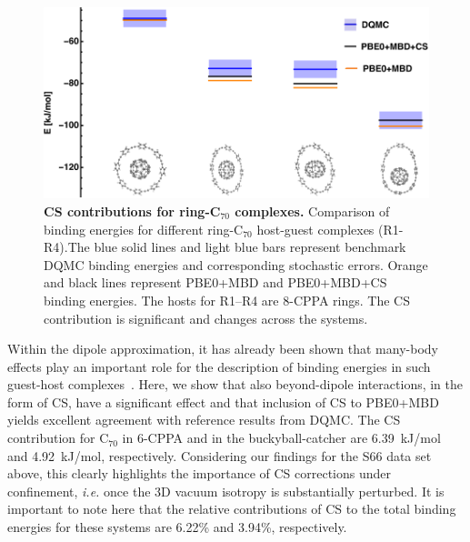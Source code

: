 \documentclass[aps,prl,groupaddress, twocolumn]{revtex4-1}  %
\begin{document}
\begin{figure}[hbtp]
\includegraphics[scale=1.]{Plots/Rings_new.pdf}
\caption{\textbf{CS contributions for ring-C$_{70}$ complexes.} Comparison of binding energies for different ring-C$_{70}$ host-guest complexes (R1-R4).The blue solid lines and light blue bars represent benchmark DQMC binding energies and corresponding stochastic errors. Orange and black lines represent PBE0+MBD and PBE0+MBD+CS binding energies. The hosts for R1--R4 are 8-CPPA rings. The CS contribution is significant and changes across the systems.}\label{fig:rings}
\end{figure}

Within the dipole approximation, it has already been shown that many-body effects play an important role for the description of binding energies in such guest-host complexes~\cite{hermann_ncomm2017}. Here, we show that also beyond-dipole interactions, in the form of CS, have a significant effect and that inclusion of CS to PBE0+MBD yields excellent agreement with reference results from DQMC\@. The CS contribution for C$_{70}$ in 6-CPPA and in the buckyball-catcher are 6.39~kJ/mol and 4.92~kJ/mol, respectively. Considering our findings for the S66 data set above, this clearly highlights the importance of CS corrections under confinement, \textit{i.e.} once the 3D vacuum isotropy is substantially perturbed. It is important to note here that the relative contributions of CS to the total binding energies for these systems are 6.22\% and 3.94\%, respectively.
\end{document}
